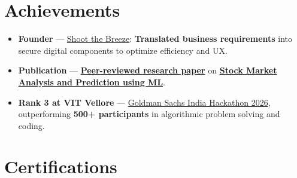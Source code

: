 \documentclass[a4paper,11pt]{article}
\newcommand{\ulink}[2]{\href{#1}{#2}}
\begin{document}
\section{Achievements}
\vspace{2pt}

\begin{itemize}[nosep, leftmargin=1.5em, itemsep=2pt, topsep=2pt]
  \item {\color[HTML]{0A0A0A}\fontsize{11}{14}\selectfont \textbf{Founder} --- \ulink{https://shoot-the-breeze.vercel.app}{Shoot the Breeze}: \textbf{Translated business requirements} into secure digital components to optimize efficiency and UX.}
  \item {\color[HTML]{0A0A0A}\fontsize{11}{14}\selectfont \textbf{Publication} --- \ulink{https://www.elruha.org/_files/ugd/614b1f_6b95e1b697bf452b9907ba46e0151c05.pdf\#page=774}{\textbf{Peer-reviewed research paper}} on \ulink{https://github.com/su-jin1425/Set-Project}{\textbf{Stock Market Analysis and Prediction using ML}}.}
  \item {\color[HTML]{0A0A0A}\fontsize{11}{14}\selectfont \textbf{Rank 3 at VIT Vellore} --- \ulink{https://www.hackerrank.com/contests/goldman-sachs-india-hackathon-2026-cs/leaderboard}{Goldman Sachs India Hackathon 2026}, outperforming \textbf{500+ participants} in algorithmic problem solving and coding.}
\end{itemize}

\section{Certifications}
\vspace{2pt}
\end{document}
